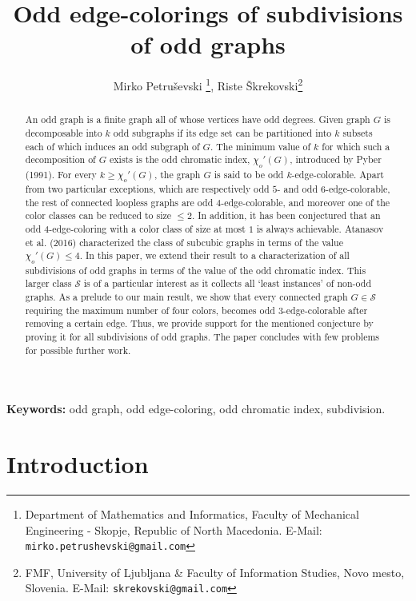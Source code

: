 \documentclass[a4paper,12pt]{article}
\title{Odd edge-colorings of subdivisions of odd graphs}
\author
{
	Mirko Petru\v{s}evski \thanks{Department of Mathematics and Informatics, Faculty of Mechanical Engineering - Skopje, Republic of North Macedonia. E-Mail: \texttt{mirko.petrushevski@gmail.com}},
	\quad
	Riste \v{S}krekovski\thanks{FMF, University of Ljubljana \& Faculty of Information Studies, Novo mesto, Slovenia. E-Mail: \texttt{skrekovski@gmail.com}}
}
\numberwithin{equation}{section}
\begin{document}
\maketitle

\begin{abstract}
An odd graph is a finite graph all of whose vertices have odd degrees. Given graph $G$ is decomposable into $k$ odd subgraphs if its edge set can be partitioned into $k$ subsets each of which induces an odd subgraph of $G$. The minimum value of $k$ for which such a decomposition of $G$ exists is the odd chromatic index, $\chi_{o}'(G)$, introduced by Pyber (1991). For every $k\geq\chi_{o}'(G)$, the graph $G$ is said to be odd $k$-edge-colorable. Apart from two particular exceptions, which are respectively odd $5$- and odd $6$-edge-colorable, the rest of connected loopless graphs are odd $4$-edge-colorable, and moreover one of the color classes can be reduced to size $\leq2$. In addition, it has been conjectured that an odd $4$-edge-coloring with a color class of size at most $1$ is always achievable. Atanasov et al. (2016) characterized the class of subcubic graphs in terms of the value $\chi_{o}'(G)\leq4$. In this paper, we extend their result to a characterization of all subdivisions of odd graphs in terms of the value of the odd chromatic index. This larger class $\mathcal{S}$ is of a particular interest as it collects all `least instances' of non-odd graphs.  As a prelude to our main result, we show that every connected graph $G\in \mathcal{S}$ requiring the maximum number of four colors, becomes odd $3$-edge-colorable after removing a certain edge. Thus, we provide support for the mentioned conjecture by proving it for all subdivisions of odd graphs. The paper concludes with few problems for possible further work.
\end{abstract}

\medskip

\noindent \textbf{Keywords:} odd graph, odd edge-coloring, odd chromatic index, subdivision.


\section{Introduction}
\end{document}
